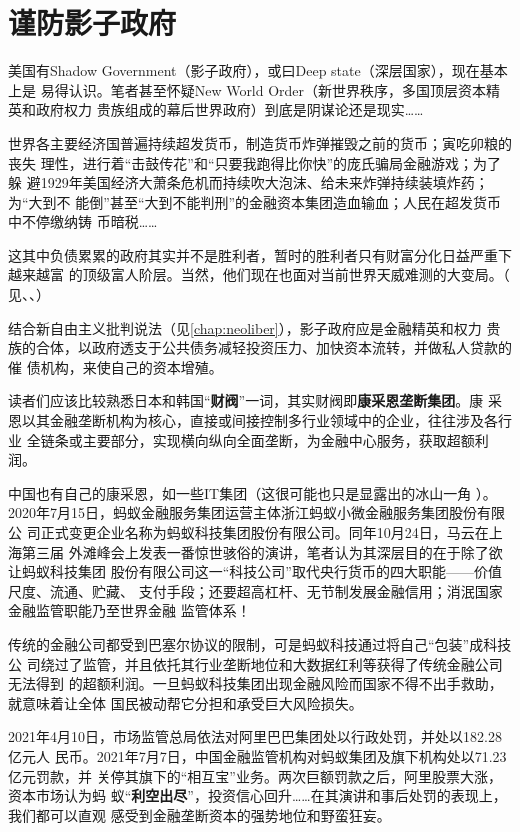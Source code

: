 \section{谨防影子政府}

美国有Shadow Government（影子政府），或曰Deep state（深层国家），现在基本上是
易得认识。笔者甚至怀疑New World Order（新世界秩序，多国顶层资本精英和政府权力
贵族组成的幕后世界政府）到底是阴谋论还是现实……

世界各主要经济国普遍持续超发货币，制造货币炸弹摧毁之前的货币；寅吃卯粮的丧失
理性，进行着“击鼓传花”和“只要我跑得比你快”的庞氏骗局金融游戏；为了躲
避1929年美国经济大萧条危机而持续吹大泡沫、给未来炸弹持续装填炸药；为“大到不
能倒”甚至“大到不能判刑”的金融资本集团造血输血；人民在超发货币中不停缴纳铸
币暗税……

这其中负债累累的政府其实并不是胜利者，暂时的胜利者只有财富分化日益严重下越来越富
的顶级富人阶层。当然，他们现在也面对当前世界天威难测的大变局。（
见\cite{piepenburg2022gold}、\cite{streeck2017will}、）

结合新自由主义批判说法（见\cref{chap:neoliber}），影子政府应是金融精英和权力
贵族的合体，以政府透支于公共债务减轻投资压力、加快资本流转，并做私人贷款的催
债机构，来使自己的资本增殖。

读者们应该比较熟悉日本和韩国“\textbf{财阀}”一词，其实财阀即\textbf{康采恩垄断集团}。康
采恩以其金融垄断机构为核心，直接或间接控制多行业领域中的企业，往往涉及各行业
全链条或主要部分，实现横向纵向全面垄断，为金融中心服务，获取超额利润。

中国也有自己的康采恩，如一些IT集团（这很可能也只是显露出的冰山一角
）。2020年7月15日，蚂蚁金融服务集团运营主体浙江蚂蚁小微金融服务集团股份有限公
司正式变更企业名称为蚂蚁科技集团股份有限公司。同年10月24日，马云在上海第三届
外滩峰会上发表一番惊世骇俗的演讲，笔者认为其深层目的在于除了欲让蚂蚁科技集团
股份有限公司这一“科技公司”取代央行货币的四大职能——价值尺度、流通、贮藏、
支付手段；还要超高杠杆、无节制发展金融信用；消泯国家金融监管职能乃至世界金融
监管体系！

传统的金融公司都受到巴塞尔协议的限制，可是蚂蚁科技通过将自己“包装”成科技公
司绕过了监管，并且依托其行业垄断地位和大数据红利等获得了传统金融公司无法得到
的超额利润。一旦蚂蚁科技集团出现金融风险而国家不得不出手救助，就意味着让全体
国民被动帮它分担和承受巨大风险损失。


2021年4月10日，市场监管总局依法对阿里巴巴集团处以行政处罚，并处以182.28亿元人
民币。2021年7月7日，中国金融监管机构对蚂蚁集团及旗下机构处以71.23亿元罚款，并
关停其旗下的“相互宝”业务。两次巨额罚款之后，阿里股票大涨，资本市场认为蚂
蚁“\textbf{利空出尽}”，投资信心回升……在其演讲和事后处罚的表现上，我们都可以直观
感受到金融垄断资本的强势地位和野蛮狂妄。


